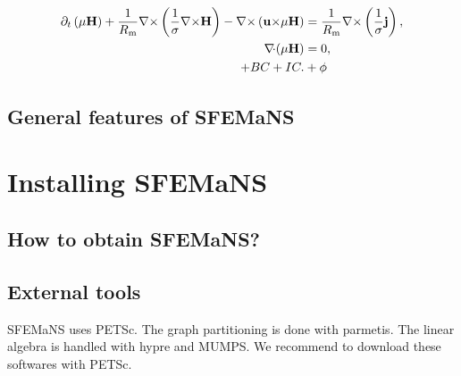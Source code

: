 \documentclass{book}
\makeatletter
\newcommand{\sfemans}{SFEMaNS\@\xspace}\newcommand{\petsc}{PETSc\@\xspace}
\makeatother
\begin{document}
\begin{align*}
\partial_t\left(\mu{\bf H}\right)+\frac{1}{R_{\text{\rm m}}}\nabla{\times}\left(\frac{1}{\sigma}\nabla{\times}{\bf H}\right)
- \nabla{\times}\left({\bf u}{\times}\mu{\bf H}\right) &=
\frac{1}{R_{\text{\rm m}}}\nabla{\times}\left(\frac{1}{\sigma}{\bf j}\right), \\ \nabla\!{\cdot}(\mu{\bf H}) &=
0, \\ +BC+IC. & +\phi
\end{align*}


\section{General features of \sfemans}

\chapter{Installing \sfemans}
\section{How to obtain \sfemans?}
\section{External tools}
\sfemans uses \petsc. The graph partitioning is done with parmetis. 
The linear algebra is handled with hypre and MUMPS. We recommend to
download these softwares with \petsc. 
\end{document}
